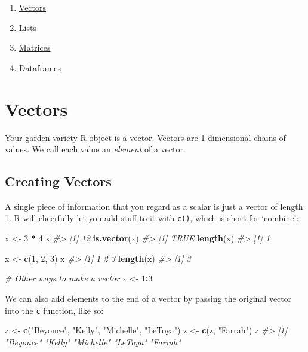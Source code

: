 \documentclass[
]{book}
\newenvironment{Shaded}{\begin{snugshade}}{\end{snugshade}}
\newcommand{\CommentTok}[1]{\textcolor[rgb]{0.56,0.35,0.01}{\textit{#1}}}
\newcommand{\DecValTok}[1]{\textcolor[rgb]{0.00,0.00,0.81}{#1}}
\newcommand{\KeywordTok}[1]{\textcolor[rgb]{0.13,0.29,0.53}{\textbf{#1}}}
\newcommand{\NormalTok}[1]{#1}
\newcommand{\OperatorTok}[1]{\textcolor[rgb]{0.81,0.36,0.00}{\textbf{#1}}}
\newcommand{\StringTok}[1]{\textcolor[rgb]{0.31,0.60,0.02}{#1}}
\providecommand{\tightlist}{%
  \setlength{\itemsep}{0pt}\setlength{\parskip}{0pt}}
\begin{document}
\begin{enumerate}
\def\labelenumi{\arabic{enumi}.}
\tightlist
\item
  \protect\hyperlink{vectors}{Vectors}
\item
  \protect\hyperlink{lists}{Lists}
\item
  \protect\hyperlink{matrices}{Matrices}
\item
  \protect\hyperlink{dataframes}{Dataframes}
\end{enumerate}

\hypertarget{vectors}{%
\section{Vectors}\label{vectors}}

Your garden variety R object is a vector. Vectors are 1-dimensional chains of values. We call each value an \emph{element} of a vector.

\hypertarget{creating-vectors}{%
\subsection{Creating Vectors}\label{creating-vectors}}

A single piece of information that you regard as a scalar is just a vector of length 1. R will cheerfully let you add stuff to it with \texttt{c()}, which is short for `combine':

\begin{Shaded}
\begin{Highlighting}[]
\NormalTok{x <-}\StringTok{ }\DecValTok{3} \OperatorTok{*}\StringTok{ }\DecValTok{4}
\NormalTok{x}
\CommentTok{#> [1] 12}
\KeywordTok{is.vector}\NormalTok{(x)}
\CommentTok{#> [1] TRUE}
\KeywordTok{length}\NormalTok{(x)}
\CommentTok{#> [1] 1}

\NormalTok{x <-}\StringTok{ }\KeywordTok{c}\NormalTok{(}\DecValTok{1}\NormalTok{, }\DecValTok{2}\NormalTok{, }\DecValTok{3}\NormalTok{)}
\NormalTok{x}
\CommentTok{#> [1] 1 2 3}
\KeywordTok{length}\NormalTok{(x)}
\CommentTok{#> [1] 3}

\CommentTok{# Other ways to make a vector}
\NormalTok{x <-}\StringTok{ }\DecValTok{1}\OperatorTok{:}\DecValTok{3}
\end{Highlighting}
\end{Shaded}

We can also add elements to the end of a vector by passing the original vector into the \texttt{c} function, like so:

\begin{Shaded}
\begin{Highlighting}[]
\NormalTok{z <-}\StringTok{ }\KeywordTok{c}\NormalTok{(}\StringTok{"Beyonce"}\NormalTok{, }\StringTok{"Kelly"}\NormalTok{, }\StringTok{"Michelle"}\NormalTok{, }\StringTok{"LeToya"}\NormalTok{)}
\NormalTok{z <-}\StringTok{ }\KeywordTok{c}\NormalTok{(z, }\StringTok{"Farrah"}\NormalTok{)}
\NormalTok{z}
\CommentTok{#> [1] "Beyonce"  "Kelly"    "Michelle" "LeToya"   "Farrah"}
\end{Highlighting}
\end{Shaded}
\end{document}
